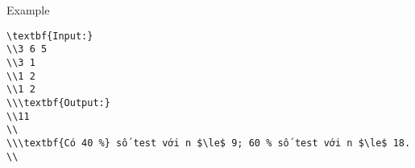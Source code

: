Example
\begin{verbatim}
\textbf{Input:}
\\3 6 5
\\3 1
\\1 2
\\1 2
\\\textbf{Output:}
\\11
\\
\\\textbf{Có 40 %} số test với n $\le$ 9; 60 % số test với n $\le$ 18.
\\\end{verbatim}